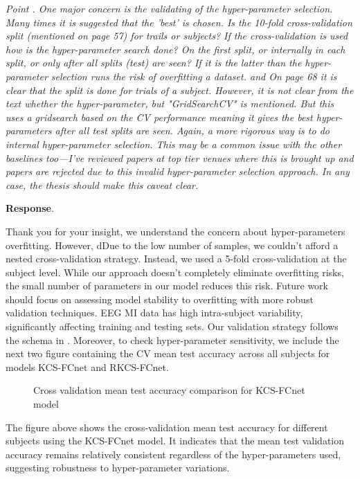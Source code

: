 \documentclass[runningheads]{llncs}
\newenvironment{reviewer}{\setcounter{pointcounter}{1}}{}
\newcommand{\point}[1]{\medskip \noindent
 \textsl{{\fontseries{b}\selectfont Point \thepointcounter}.
 \stepcounter{pointcounter} #1}}
\newcommand{\reply}{\medskip \noindent \textbf{Response}.\ }
\begin{document}
\begin{reviewer}
\point{One major concern is the validating of the hyper-parameter selection. Many times it is suggested that the 'best' is chosen. Is the 10-fold cross-validation split (mentioned on page 57) for trails or subjects? If the cross-validation is used how is the hyper-parameter search done? On the first split, or internally in each split, or only after all splits (test) are seen? If it is the latter than the hyper-parameter selection runs the risk of overfitting a dataset. and On page 68 it is clear that the split is done for trials of a subject.  However, it is not clear from the text whether the hyper-parameter, but "GridSearchCV" is mentioned. But this uses a gridsearch based on the CV performance meaning it gives the best hyper-parameters after all test splits are seen. Again, a more rigorous way is to do internal hyper-parameter selection. This may be a common issue with the other baselines too—I've reviewed papers at top tier venues where this is brought up and papers are rejected due to this invalid hyper-parameter selection approach.  In any case, the thesis should make this caveat clear.}

\reply{Thank you for your insight, we understand the concern about hyper-parameters overfitting. However, dDue to the low number of samples, we couldn't afford a nested cross-validation strategy. Instead, we used a 5-fold cross-validation at the subject level. While our approach doesn't completely eliminate overfitting risks, the small number of parameters in our model reduces this risk. Future work should focus on assessing model stability to overfitting with more robust validation techniques. EEG MI data has high intra-subject variability, significantly affecting training and testing sets. Our validation strategy follows the schema in \cite{schirrmeister2017deep}. Moreover, to check hyper-parameter sensitivity, we include the next two figure containing the CV mean test accuracy across all subjects for models KCS-FCnet and RKCS-FCnet.
\begin{figure}[h!]
  \centering
  \resizebox{\linewidth}{!}{}
  \caption{Cross validation mean test accuracy comparison for KCS-FCnet model}
\end{figure}
The figure above shows the cross-validation mean test accuracy for different subjects using the KCS-FCnet model. It indicates that the mean test validation accuracy remains relatively consistent regardless of the hyper-parameters used, suggesting robustness to hyper-parameter variations.

}
\end{reviewer}
\end{document}

